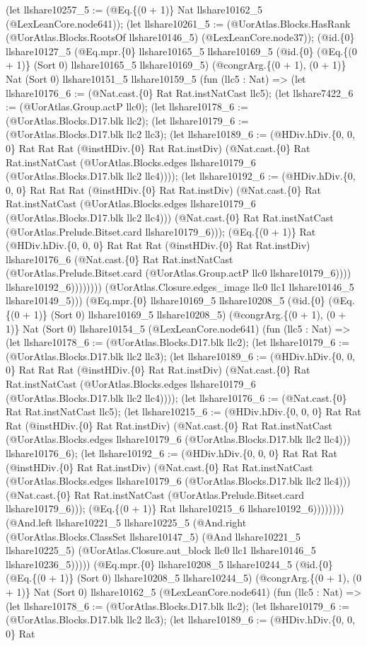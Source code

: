 \documentclass[11pt]{article}
\begin{document}
(let llshare10257\_5 := (@Eq.\{(0 + 1)\} Nat llshare10162\_5 (@LexLeanCore.node641)); (let llshare10261\_5 := (@UorAtlas.Blocks.HasRank (@UorAtlas.Blocks.RootsOf llshare10146\_5) (@LexLeanCore.node37)); (@id.\{0\} llshare10127\_5 (@Eq.mpr.\{0\} llshare10165\_5 llshare10169\_5 (@id.\{0\} (@Eq.\{(0 + 1)\} (Sort 0) llshare10165\_5 llshare10169\_5) (@congrArg.\{(0 + 1), (0 + 1)\} Nat (Sort 0) llshare10151\_5 llshare10159\_5 (fun (llc5 : Nat) => (let llshare10176\_6 := (@Nat.cast.\{0\} Rat Rat.instNatCast llc5); (let llshare7422\_6 := (@UorAtlas.Group.actP llc0); (let llshare10178\_6 := (@UorAtlas.Blocks.D17.blk llc2); (let llshare10179\_6 := (@UorAtlas.Blocks.D17.blk llc2 llc3); (let llshare10189\_6 := (@HDiv.hDiv.\{0, 0, 0\} Rat Rat Rat (@instHDiv.\{0\} Rat Rat.instDiv) (@Nat.cast.\{0\} Rat Rat.instNatCast (@UorAtlas.Blocks.edges llshare10179\_6 (@UorAtlas.Blocks.D17.blk llc2 llc4)))); (let llshare10192\_6 := (@HDiv.hDiv.\{0, 0, 0\} Rat Rat Rat (@instHDiv.\{0\} Rat Rat.instDiv) (@Nat.cast.\{0\} Rat Rat.instNatCast (@UorAtlas.Blocks.edges llshare10179\_6 (@UorAtlas.Blocks.D17.blk llc2 llc4))) (@Nat.cast.\{0\} Rat Rat.instNatCast (@UorAtlas.Prelude.Bitset.card llshare10179\_6))); (@Eq.\{(0 + 1)\} Rat (@HDiv.hDiv.\{0, 0, 0\} Rat Rat Rat (@instHDiv.\{0\} Rat Rat.instDiv) llshare10176\_6 (@Nat.cast.\{0\} Rat Rat.instNatCast (@UorAtlas.Prelude.Bitset.card (@UorAtlas.Group.actP llc0 llshare10179\_6)))) llshare10192\_6)))))))) (@UorAtlas.Closure.edges\_image llc0 llc1 llshare10146\_5 llshare10149\_5))) (@Eq.mpr.\{0\} llshare10169\_5 llshare10208\_5 (@id.\{0\} (@Eq.\{(0 + 1)\} (Sort 0) llshare10169\_5 llshare10208\_5) (@congrArg.\{(0 + 1), (0 + 1)\} Nat (Sort 0) llshare10154\_5 (@LexLeanCore.node641) (fun (llc5 : Nat) => (let llshare10178\_6 := (@UorAtlas.Blocks.D17.blk llc2); (let llshare10179\_6 := (@UorAtlas.Blocks.D17.blk llc2 llc3); (let llshare10189\_6 := (@HDiv.hDiv.\{0, 0, 0\} Rat Rat Rat (@instHDiv.\{0\} Rat Rat.instDiv) (@Nat.cast.\{0\} Rat Rat.instNatCast (@UorAtlas.Blocks.edges llshare10179\_6 (@UorAtlas.Blocks.D17.blk llc2 llc4)))); (let llshare10176\_6 := (@Nat.cast.\{0\} Rat Rat.instNatCast llc5); (let llshare10215\_6 := (@HDiv.hDiv.\{0, 0, 0\} Rat Rat Rat (@instHDiv.\{0\} Rat Rat.instDiv) (@Nat.cast.\{0\} Rat Rat.instNatCast (@UorAtlas.Blocks.edges llshare10179\_6 (@UorAtlas.Blocks.D17.blk llc2 llc4))) llshare10176\_6); (let llshare10192\_6 := (@HDiv.hDiv.\{0, 0, 0\} Rat Rat Rat (@instHDiv.\{0\} Rat Rat.instDiv) (@Nat.cast.\{0\} Rat Rat.instNatCast (@UorAtlas.Blocks.edges llshare10179\_6 (@UorAtlas.Blocks.D17.blk llc2 llc4))) (@Nat.cast.\{0\} Rat Rat.instNatCast (@UorAtlas.Prelude.Bitset.card llshare10179\_6))); (@Eq.\{(0 + 1)\} Rat llshare10215\_6 llshare10192\_6)))))))) (@And.left llshare10221\_5 llshare10225\_5 (@And.right (@UorAtlas.Blocks.ClassSet llshare10147\_5) (@And llshare10221\_5 llshare10225\_5) (@UorAtlas.Closure.aut\_block llc0 llc1 llshare10146\_5 llshare10236\_5))))) (@Eq.mpr.\{0\} llshare10208\_5 llshare10244\_5 (@id.\{0\} (@Eq.\{(0 + 1)\} (Sort 0) llshare10208\_5 llshare10244\_5) (@congrArg.\{(0 + 1), (0 + 1)\} Nat (Sort 0) llshare10162\_5 (@LexLeanCore.node641) (fun (llc5 : Nat) => (let llshare10178\_6 := (@UorAtlas.Blocks.D17.blk llc2); (let llshare10179\_6 := (@UorAtlas.Blocks.D17.blk llc2 llc3); (let llshare10189\_6 := (@HDiv.hDiv.\{0, 0, 0\} Rat 
\end{document}
